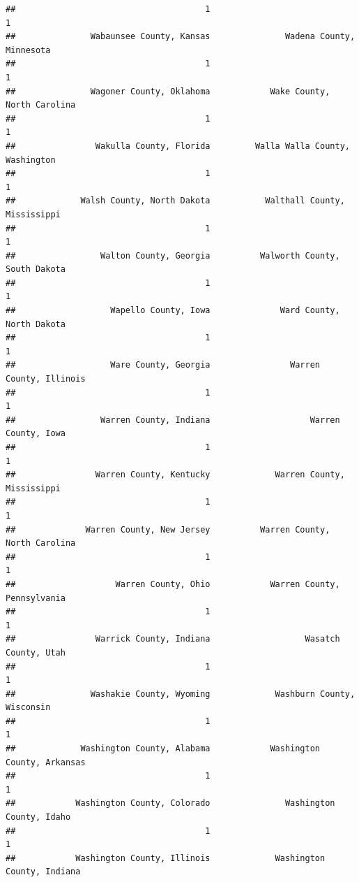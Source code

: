 \documentclass[
]{article}
\begin{document}
\begin{verbatim}
##                                      1                                      1 
##               Wabaunsee County, Kansas               Wadena County, Minnesota 
##                                      1                                      1 
##               Wagoner County, Oklahoma            Wake County, North Carolina 
##                                      1                                      1 
##                Wakulla County, Florida         Walla Walla County, Washington 
##                                      1                                      1 
##             Walsh County, North Dakota           Walthall County, Mississippi 
##                                      1                                      1 
##                 Walton County, Georgia          Walworth County, South Dakota 
##                                      1                                      1 
##                   Wapello County, Iowa              Ward County, North Dakota 
##                                      1                                      1 
##                   Ware County, Georgia                Warren County, Illinois 
##                                      1                                      1 
##                 Warren County, Indiana                    Warren County, Iowa 
##                                      1                                      1 
##                Warren County, Kentucky             Warren County, Mississippi 
##                                      1                                      1 
##              Warren County, New Jersey          Warren County, North Carolina 
##                                      1                                      1 
##                    Warren County, Ohio            Warren County, Pennsylvania 
##                                      1                                      1 
##                Warrick County, Indiana                   Wasatch County, Utah 
##                                      1                                      1 
##               Washakie County, Wyoming             Washburn County, Wisconsin 
##                                      1                                      1 
##             Washington County, Alabama            Washington County, Arkansas 
##                                      1                                      1 
##            Washington County, Colorado               Washington County, Idaho 
##                                      1                                      1 
##            Washington County, Illinois             Washington County, Indiana 

\end{verbatim}
\end{document}
